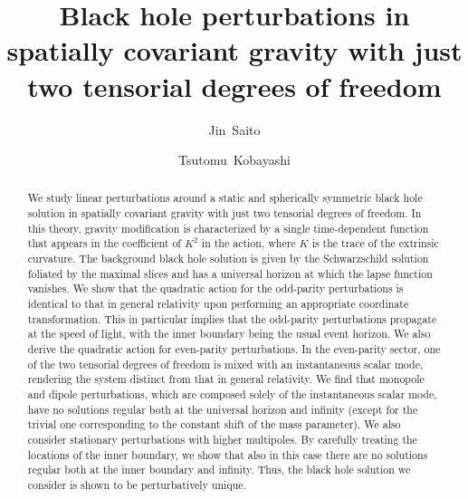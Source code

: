 \documentclass[aps,prd,preprintnumbers,superscriptaddress,nofootinbib,notitlepage]{revtex4-2}
\begin{document}
\title{Black hole perturbations in spatially covariant gravity with just two tensorial degrees of freedom}
\author{Jin~Saito}
%
\author{Tsutomu~Kobayashi}
\begin{abstract}
We study linear perturbations around a static and spherically symmetric black hole solution in spatially covariant gravity with just two tensorial degrees of freedom.
In this theory, gravity modification is characterized by a single time-dependent function that appears in the coefficient of $K^2$ in the action, where $K$ is the trace of the extrinsic curvature.
The background black hole solution is given by the Schwarzschild solution foliated by the maximal slices and has a universal horizon at which the lapse function vanishes.
We show that the quadratic action for the odd-parity perturbations is identical to that in general relativity upon performing an appropriate coordinate transformation.
This in particular implies that the odd-parity perturbations propagate at the speed of light, with the inner boundary being the usual event horizon.
We also derive the quadratic action for even-parity perturbations.
In the even-parity sector, one of the two tensorial degrees of freedom is mixed with an instantaneous scalar mode, rendering the system distinct from that in general relativity.
We find that monopole and dipole perturbations, which are composed solely of the instantaneous scalar mode, have no solutions regular both at the universal horizon and infinity (except for the trivial one corresponding to the constant shift of the mass parameter).
We also consider stationary perturbations with higher multipoles.
By carefully treating the locations of the inner boundary, we show that also in this case there are no solutions regular both at the inner boundary and infinity.
Thus, the black hole solution we consider is shown to be perturbatively unique.
\end{abstract}
\maketitle
\end{document}
